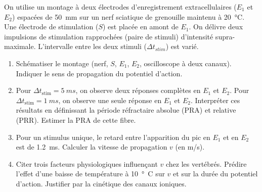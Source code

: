 \documentclass[11pt]{article}
\begin{document}
\begin{exercice}
On utilise un montage à deux électrodes d'enregistrement extracellulaires ($E_1$ et $E_2$) espacées de \SI{50}{\milli\metre} sur un nerf sciatique de grenouille maintenu à \SI{20}{\celsius}. Une électrode de stimulation ($S$) est placée en amont de $E_1$. On délivre deux impulsions de stimulation rapprochées (paire de stimuli) d'intensité supra-maximale. L'intervalle entre les deux stimuli ($\Delta t_{stim}$) est varié.
\begin{enumerate}
    \item Schématiser le montage (nerf, $S$, $E_1$, $E_2$, oscilloscope à deux canaux). Indiquer le sens de propagation du potentiel d'action.
    \item Pour $\Delta t_{\text{stim}} = \SI{5}{ms}$, on observe deux réponses complètes en $E_1$ et $E_2$. Pour $\Delta t_{\text{stim}} = \SI{1}{ms}$, on observe une seule réponse en $E_1$ et $E_2$. Interpréter ces résultats en définissant la période réfractaire absolue (PRA) et relative (PRR). Estimer la PRA de cette fibre.
    \item Pour un stimulus unique, le retard entre l'apparition du pic en $E_1$ et en $E_2$ est de \SI{1,2}{ms}. Calculer la vitesse de propagation $v$ (en \si{m/s}).
    \item Citer trois facteurs physiologiques influençant $v$ chez les vertébrés. Prédire l'effet d'une baisse de température à \SI{10}{°C} sur $v$ et sur la durée du potentiel d'action. Justifier par la cinétique des canaux ioniques.
\end{enumerate}
\end{exercice}
\end{document}
